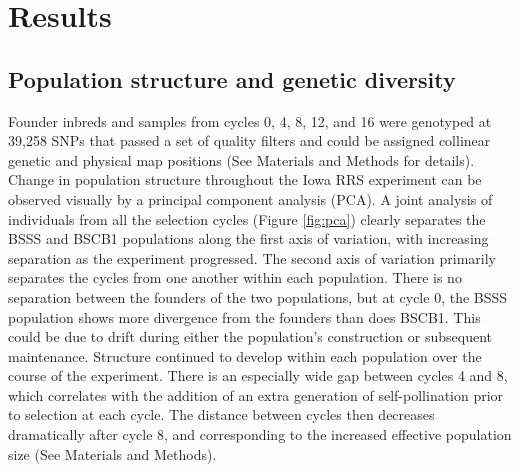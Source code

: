 \section*{Results}

\subsection*{Population structure and genetic diversity}
Founder inbreds and samples from cycles 0, 4, 8, 12, and 16 were genotyped at 39,258 SNPs that passed a set of quality filters and could be assigned collinear genetic and physical map positions (See Materials and Methods for details). 
Change in population structure throughout the Iowa RRS experiment can be observed visually by a principal component analysis (PCA). 
A joint analysis of individuals from all the selection cycles (Figure \ref{fig:pca}) clearly separates the BSSS and BSCB1 populations along the first axis of variation, with increasing separation as the experiment progressed. 
The second axis of variation primarily separates the cycles from one another within each population. 
There is no separation between the founders of the two populations, but at cycle 0, the BSSS population shows more divergence from the founders than does BSCB1. 
This could be due to drift during either the population’s construction or subsequent maintenance. 
Structure continued to develop within each population over the course of the experiment. 
There is an especially wide gap between cycles 4 and 8, which correlates with the addition of an extra generation of self-pollination prior to selection at each cycle. 
The distance between cycles then decreases dramatically after cycle 8, and corresponding to the increased effective population size (See Materials and Methods).

